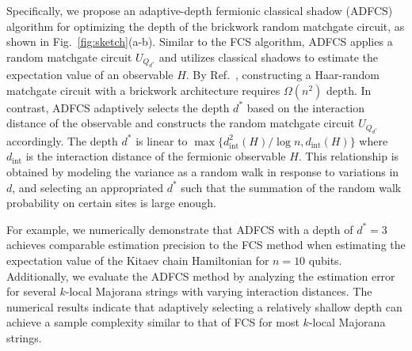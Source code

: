 \documentclass[showpacs,onecolumn,aps,prx,long bibliography,superscriptaddress,notitlepage]{revtex4-1}
\newcommand{\cbra}[1]{\{ #1 \}}
\begin{document}
Specifically, we propose an adaptive-depth fermionic classical shadow (ADFCS) algorithm for optimizing the depth of the brickwork random matchgate circuit, as shown in Fig.~\ref{fig:sketch}(a-b). 
Similar to the FCS algorithm, ADFCS applies a random matchgate circuit $U_{Q_{d^\ast}}$ and utilizes classical shadows to estimate the expectation value of an observable $H$. 
By Ref.~\cite{Jiang18Quantum}, constructing a Haar-random matchgate circuit with a brickwork architecture requires $\Omega(n^2)$ depth. In contrast, ADFCS adaptively selects the depth $d^\ast$ based on the interaction distance of the observable and constructs the random matchgate circuit $U_{Q_{d^\ast}}$ accordingly.
The depth $d^\ast$ is linear to $\max\cbra{d^2_{\text{int}}(H)/\log n, d_{\text{int}}(H)}$ where $d_{\text{int}}$ is the interaction distance of the fermionic observable $H$. This relationship is obtained by modeling the variance as a random walk in response to variations in $d$, and selecting an appropriated $d^\ast$ such that the summation of the random walk probability on certain sites is large enough. 

For example, we numerically demonstrate that ADFCS with a depth of $d^\ast = 3$ achieves comparable estimation precision to the FCS method when estimating the expectation value of the Kitaev chain Hamiltonian for $n=10$ qubits. Additionally, we evaluate the ADFCS method by analyzing the estimation error for several $k$-local  Majorana strings with varying interaction distances. The numerical results indicate that adaptively selecting a relatively shallow depth can achieve a sample complexity similar to that of FCS for most $k$-local Majorana strings.
\end{document}
